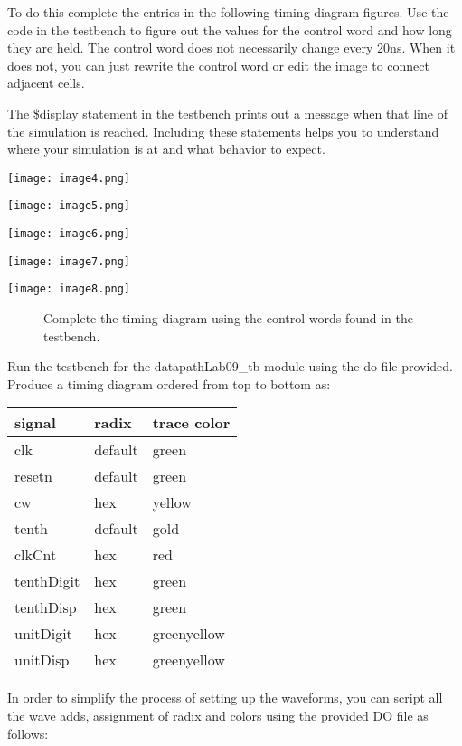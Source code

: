 To do this complete the entries in the following timing diagram figures.
Use the code in the testbench to figure out the values for the control
word and how long they are held. The control word does not necessarily
change every 20ns. When it does not, you can just rewrite the control
word or edit the image to connect adjacent cells.

The \$display statement in the testbench prints out a message when that
line of the simulation is reached. Including these statements helps you
to understand where your simulation is at and what behavior to expect.

\begin{landscape}
\texttt{[image:  image4.png]}

\texttt{[image:  image5.png]}

\texttt{[image:  image6.png]}

\texttt{[image:  image7.png]}

\texttt{[image:  image8.png]}

\begin{figure}[ht]
\caption{Complete the timing diagram using the control words found in the testbench.}
\label{figure:swDPtiming}
\end{figure}

\end{landscape}

Run the testbench for the datapathLab09\_tb module using the do file
provided. Produce a timing diagram ordered from top to bottom as:

\begin{tabular}{p{3cm}p{3cm}p{3cm}}
signal & radix & trace color \\ \hline
  clk 		& default 	& green  \\
  resetn 		& default 	& green  \\
  cw 		& hex 		& yellow  \\
  tenth 		& default 	& gold  \\
  clkCnt 		& hex 		& red  \\
  tenthDigit 	& hex 		& green  \\
  tenthDisp 	& hex 		& green  \\
  unitDigit 	& hex 		& greenyellow  \\
  unitDisp 	& hex 		& greenyellow  \\
\end{tabular}

In order to simplify the process of setting up the waveforms, you can
script all the wave adds, assignment of radix and colors using the
provided DO file as follows:

